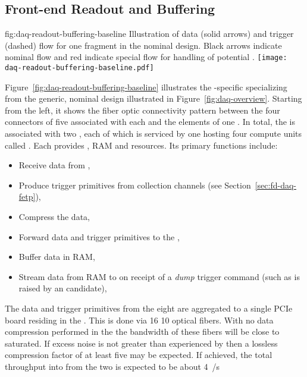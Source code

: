 

\subsection{Front-end Readout and Buffering}
\label{sec:fd-daq-fero}


\begin{dunefigure}{fig:daq-readout-buffering-baseline}
  {Illustration of data (solid arrows) and trigger (dashed) flow for
    one \single {} fragment in the nominal design. 
    Black arrows indicate nominal flow and red indicate special flow
    for handling of potential .  } %
  \texttt{[image: daq-readout-buffering-baseline.pdf]}%
\end{dunefigure}


Figure~\ref{fig:daq-readout-buffering-baseline} illustrates the
-specific  specializing from the generic,
nominal design illustrated in Figure~\ref{fig:daq-overview}.  
Starting from the left, it shows the fiber optic connectivity pattern
between the four connectors of five   associated
with each  and the elements of one  . 
In total, the  is associated with two , each of which
is serviced by one   hosting four compute
units called . 
Each  provides , RAM and  resources.
Its primary functions include:
\begin{itemize}
\item Receive data from ,
\item Produce trigger primitives from collection channels (see Section~\ref{sec:fd-daq-fetp}),
\item Compress the data,
\item Forward data and trigger primitives to the ,
\item Buffer data in RAM, 
\item Stream data from RAM to  on receipt of a \textit{dump}
  trigger command (such as is raised by an  candidate),
\end{itemize}

The data and trigger primitives from the eight  are
aggregated to a single  PCIe board residing in the
. 
This is done via \num{16} \SI{10}{\Gbps} optical fibers. 
With no data compression performed in the  the bandwidth
of these fibers will be close to saturated. 
If excess noise is not greater than experienced by \microboone then a
lossless compression factor of at least five may be expected.
If achieved, the total throughput into  from the two 
is expected to be about \SI{4}{\GB/s}

